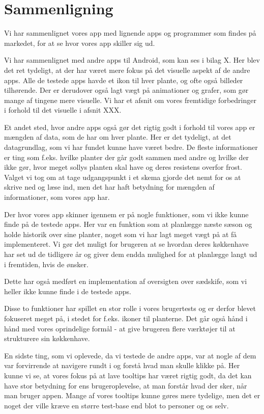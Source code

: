 \section{Sammenligning}
Vi har sammenlignet vores app med lignende apps og programmer som findes på markedet, for at se hvor vores app skiller sig ud.

Vi har sammenlignet med andre apps til Android, som kan ses i bilag X. Her blev det ret tydeligt, at der har været mere fokus på det visuelle aspekt af de andre apps. Alle de testede apps havde et ikon til hver plante, og ofte også billeder tilhørende. Der er derudover også lagt vægt på animationer og grafer, som gør mange af tingene mere visuelle. Vi har et afsnit om vores fremtidige forbedringer i forhold til det visuelle i afsnit XXX.

Et andet sted, hvor andre apps også gør det rigtig godt i forhold til vores app er mængden af data, som de har om hver plante. Her er det tydeligt, at det datagrundlag, som vi har fundet kunne have været bedre. De fleste informationer er ting som f.eks. hvilke planter der går godt sammen med andre og hvilke der ikke gør, hvor meget sollys planten skal have og deres resistens overfor frost. Valget vi tog om at tage udgangspunkt i et skema gjorde det nemt for os at skrive ned og læse ind, men det har haft betydning for mængden af informationer, som vores app har.

Der hvor vores app skinner igennem er på nogle funktioner, som vi ikke kunne finde på de testede apps. Her var en funktion som at planlægge næste sæson og holde historik over sine planter, noget som vi har lagt meget vægt på at få implementeret. Vi gør det muligt for brugeren at se hvordan deres køkkenhave har set ud de tidligere år og giver dem endda mulighed for at planlægge langt ud i fremtiden, hvis de ønsker.

Dette har også medført en implementation af oversigten over sædskife, som vi heller ikke kunne finde i de testede apps.

Disse to funktioner har spillet en stor rolle i vores brugertests og er derfor blevet fokuseret meget på, i stedet for f.eks. ikoner til planterne. Det går også hånd i hånd med vores oprindelige formål - at give brugeren flere værktøjer til at strukturere sin køkkenhave.

En sidste ting, som vi oplevede, da vi testede de andre apps, var at nogle af dem var forvirrende at navigere rundt i og forstå hvad man skulle klikke på. Her kunne vi se, at vores fokus på at lave tooltips har været rigtig godt, da det kan have stor betydning for ens brugeroplevelse, at man forstår hvad der sker, når man bruger appen. Mange af vores tooltips kunne gøres mere tydelige, men det er noget der ville kræve en større test-base end blot to personer og os selv.
